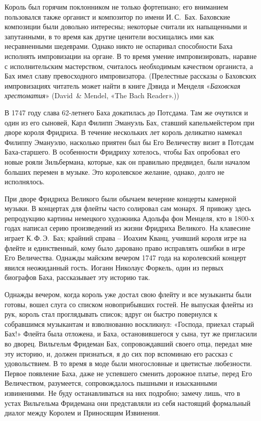 \documentclass[../main.tex]{subfiles}
\begin{document}
Король был горячим поклонником не только фортепиано; его вниманием пользовался также органист и композитор по имени И.\,С.~Бах. Баховские композиции были довольно интересны; некоторые считали их напыщенными и запутанными, в то время как другие ценители восхищались ими как несравненными шедеврами. Однако никто не оспаривал способности Баха исполнять импровизации на органе. В то время умение импровизировать, наравне с исполнительским мастерством, считалось необходимым качеством органиста, а Бах имел славу превосходного импровизатора. (Прелестные рассказы о Баховских импровизациях читатель может найти в книге Дэвида и Менделя «\emph{Баховская хрестоматия}» (David~\& Mendel, «The Bach Reader».))

В 1747 году слава 62-летнего Баха докатилась до Потсдама. Там же очутился и один из его сыновей, Карл Филипп Эмануэль Бах, ставший капельмейстером при дворе короля Фридриха. В течение нескольких лет король деликатно намекал Филиппу Эмануэлю, насколько приятен был бы Его Величеству визит в Потсдам Баха-старшего. В особенности Фридриху хотелось, чтобы Бах опробовал его новые рояли Зильбермана, которые, как он правильно предвидел, были началом больших перемен в музыке. Это королевское желание, однако, долго не исполнялось.

При дворе Фридриха Великого были обычаем вечерние концерты камерной музыки. В концертах для флейты часто солировал сам монарх. Я привожу здесь репродукцию картины немецкого художника Адольфа фон Менцеля, кто в 1800-х годах написал серию произведений из жизни Фридриха Великого. На клавесине играет К.\,Ф.\,Э.~Бах; крайний справа \--- Иоахим Кванц, учивший короля игре на флейте и единственный, кому было даровано право исправлять ошибки в игре Его Величества. Однажды майским вечером 1747 года на королевский концерт явился неожиданный гость. Иоганн Николаус Форкель, один из первых биографов Баха, рассказывает эту историю так.

Однажды вечером, когда король уже достал свою флейту и все музыканты были готовы, вошел слуга со списком новоприбывших гостей. Не выпуская флейты из рук, король стал проглядывать список; вдруг он быстро повернулся к собравшимся музыкантам и взволнованно воскликнул: «Господа, приехал старый Бах!» Флейта была отложена, и Баха, остановившегося у сына, тут же пригласили во дворец. Вильгельм Фридеман Бах, сопровождавший своего отца, передал мне эту историю, и, должен признаться, я до сих пор вспоминаю его рассказ с удовольствием. В то время в моде были многословные и цветистые любезности. Первое появление Баха, даже не успевшего сменить дорожное платье, перед Его Величеством, разумеется, сопровождалось пышными и изысканными извинениями. Не буду останавливаться на них подробно; замечу лишь, что в устах Вильгельма Фридемана они представляли из себя настоящий формальный диалог между Королем и Приносящим Извинения.
\end{document}
